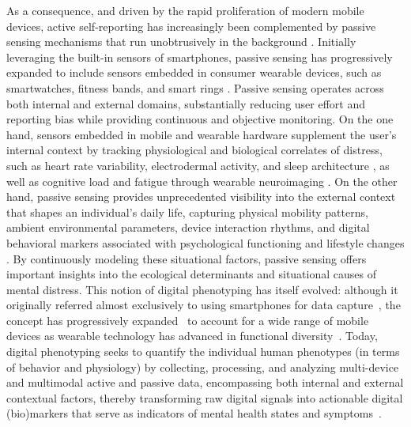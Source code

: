As a consequence, and driven by the rapid proliferation of modern mobile devices, active self-reporting has increasingly been complemented by passive sensing mechanisms that run unobtrusively in the background \cite{miralles2020smartphone, shen2025passive}. Initially leveraging the built-in sensors of smartphones, passive sensing has progressively expanded to include sensors embedded in consumer wearable devices, such as smartwatches, fitness bands, and smart rings \cite{hassan2025utility, jung2025key}. Passive sensing operates across both internal and external domains, substantially reducing user effort and reporting bias while providing continuous and objective monitoring. On the one hand, sensors embedded in mobile and wearable hardware supplement the user's internal context by tracking physiological and biological correlates of distress, such as heart rate variability, electrodermal activity, and sleep architecture \cite{hickey2021wearablemental, sheikh2021passivesensing}, as well as cognitive load and fatigue through wearable neuroimaging \cite{varandas2022cognitivefatigue}. On the other hand, passive sensing provides unprecedented visibility into the external context that shapes an individual's daily life, capturing physical mobility patterns, ambient environmental parameters, device interaction rhythms, and digital behavioral markers associated with psychological functioning and lifestyle changes \cite{onnela2016digitalphenotyping, sheikh2021passivesensing, deangel2022passivemonitoring}. By continuously modeling these situational factors, passive sensing offers important insights into the ecological determinants and situational causes of mental distress. %
This notion of digital phenotyping has itself evolved: although it originally referred almost exclusively to using smartphones for data capture~\cite{onnela2016digitalphenotyping}, the concept has progressively expanded~\cite{deboer2023} to account for a wide range of mobile devices as wearable technology has advanced in functional diversity~\cite{ometov2021}. Today, digital phenotyping seeks to quantify the individual human phenotypes (in terms of behavior and physiology) by collecting, processing, and analyzing multi-device and multimodal active and passive data, encompassing both internal and external contextual factors, thereby transforming raw digital signals into actionable digital (bio)markers that serve as indicators of mental health states and symptoms~\cite{bufano2023digital, moura2023digital}.

